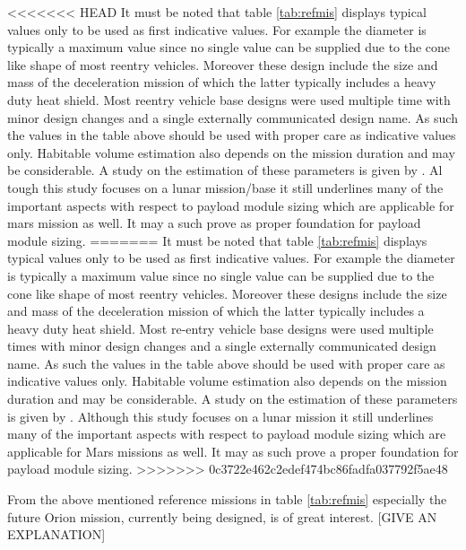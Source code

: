 <<<<<<< HEAD
It must be noted that table \ref{tab:refmis} displays typical values only to be used as first indicative values. For example the diameter is typically a maximum value since no single value can be supplied due to the cone like shape of most reentry vehicles. Moreover these design include the size and mass of the deceleration mission of which the latter typically includes a heavy duty heat shield. Most reentry vehicle base designs were used multiple time with minor design changes and a single externally communicated design name. As such the values in the table above should be used with proper care as indicative values only. Habitable volume estimation also depends on the mission duration and may be considerable. A study on the estimation of these parameters is given by \cite{Rudisill2008}. Al tough this study focuses on a lunar mission/base it still underlines many of the important aspects with respect to payload module sizing which are applicable for mars mission as well. It may a such prove as proper foundation for payload module sizing. 
=======
It must be noted that table \ref{tab:refmis} displays typical values only to be used as first indicative values. For example the diameter is typically a maximum value since no single value can be supplied due to the cone like shape of most reentry vehicles. Moreover these designs include the size and mass of the deceleration mission of which the latter typically includes a heavy duty heat shield. Most re-entry vehicle base designs were used multiple times with minor design changes and a single externally communicated design name. As such the values in the table above should be used with proper care as indicative values only. Habitable volume estimation also depends on the mission duration and may be considerable. A study on the estimation of these parameters is given by \cite{Rudisill}. Although this study focuses on a lunar mission it still underlines many of the important aspects with respect to payload module sizing which are applicable for Mars missions as well. It may as such prove a proper foundation for payload module sizing. 
>>>>>>> 0c3722e462c2edef474bc86fadfa037792f5ae48

From the above mentioned reference missions in table \ref{tab:refmis} especially the future Orion mission, currently being designed, is of great interest.  [GIVE AN EXPLANATION]
